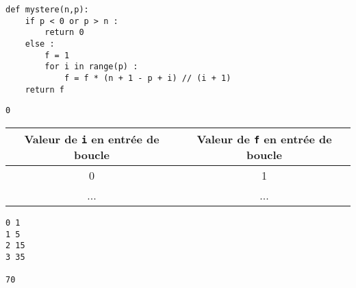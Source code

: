 \ifprof 
\else
\begin{lstlisting}
def mystere(n,p):
    if p < 0 or p > n :
        return 0
    else :
        f = 1
        for i in range(p) :
            f = f * (n + 1 - p + i) // (i + 1)
    return f
\end{lstlisting}
\fi

\ifprof
\begin{corrige}
\begin{lstlisting}
0
\end{lstlisting}
\end{corrige}
\else
\fi

\vspace{-.5cm}

\ifprof 
\else
\vspace{-1cm}
\begin{center}
\begin{tabular}{|c|c|}
\hline 
Valeur de \texttt{i} en entrée de boucle & Valeur de \texttt{f} en entrée de boucle \\
\hline 
0 & 1 \\
\hline 
... & ...\\
\hline 
\end{tabular}
\end{center}
\fi

\ifprof
\begin{corrige}
\begin{lstlisting}
0 1
1 5
2 15
3 35

70
\end{lstlisting}
\end{corrige}
\else
\fi
